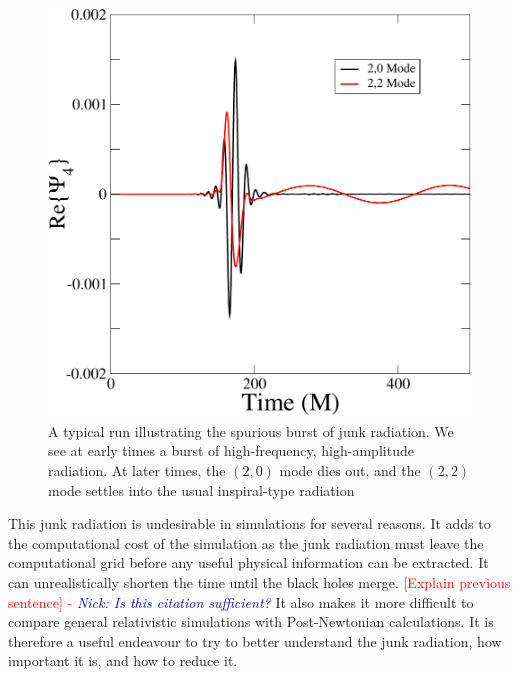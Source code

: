 \documentclass[aps,prd,amsmath,floatfix,twocolumn,superscriptaddress,nofootinbib,showpacs]{revtex4-1}
\theoremstyle{plain}
\theoremstyle{definition}
\newcommand{\red}[1]{\textcolor{Red}{#1}}
\newcommand{\nick}[1]{\textcolor{blue}{\textit{Nick: #1}}}
\begin{document}
\begin{figure}
 \includegraphics[scale=0.50]{Typical}
  \caption{A typical run illustrating the spurious burst of junk radiation. We see at early times a burst of high-frequency, high-amplitude radiation. At later times, the $(2,0)$ mode dies out, and the $(2,2)$ mode settles into the usual inspiral-type radiation}
  \label{fig:Typical}
\end{figure}


This junk radiation is undesirable in simulations for several
reasons. It adds to the computational cost of the simulation as the
junk radiation must leave the computational grid before any useful
physical information can be extracted.  It can unrealistically shorten
the time until the black holes
merge\cite{BodeEtAl:2008}. \red{[Explain previous sentence] - \nick{Is this
  citation sufficient?}} It also makes it more difficult
to compare general relativistic simulations with Post-Newtonian
calculations. It is therefore a useful endeavour to try to better
understand the junk radiation, how important it is, and how to reduce
it.
\end{document}

